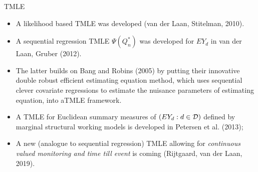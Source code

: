 \documentclass[t]{beamer}
\begin{document}
\begin{frame}{TMLE}
\begin{itemize}
\item A likelihood based TMLE was developed (van der Laan, Stitelman, 2010).
\item A sequential regression TMLE $\Psi(Q_n^*)$ was developed for $EY_d$ in van der Laan, Gruber (2012).
\item The latter builds on Bang and Robins (2005) by   putting their innovative double robust efficient estimating equation method, which uses sequential clever covariate regressions to estimate the nuisance parameters of estimating equation, into  aTMLE framework.
\item A TMLE for Euclidean summary measures of $(EY_d:d\in {\cal D})$ defined by marginal structural working models
is developed  in Petersen et al. (2013);
  \item A new (analogue to sequential regression) TMLE allowing for {\em continuous valued monitoring and time till event} is coming (Rijtgaard, van der Laan, 2019).
 \end{itemize}
 \end{frame}
\end{document}
